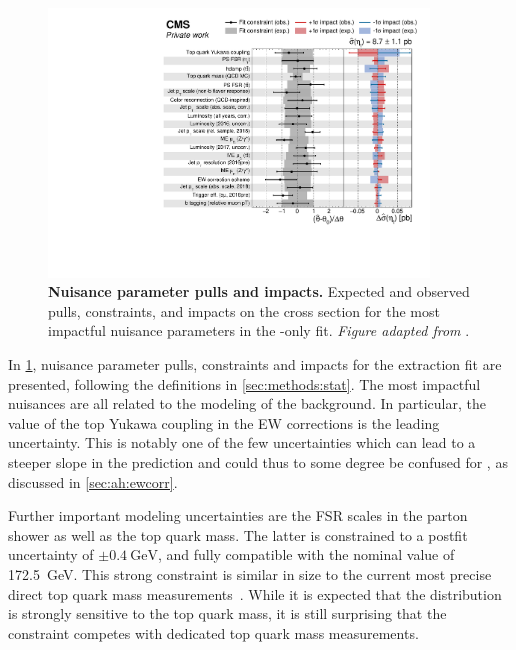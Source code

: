 \begin{figure}[th]
    \centering
    \includegraphics[width=0.9\textwidth]{figures/ah/etatfit/impacts_nonps.pdf}
    \caption{
        \textbf{Nuisance parameter pulls and impacts.} Expected and observed pulls, constraints, and impacts on the \etat cross section for the most impactful nuisance parameters in the \etat-only fit. \textit{Figure adapted from }.
    }
    \label{fig:ah:impacts_etat}
\end{figure}

In \cref{fig:ah:impacts_etat}, nuisance parameter pulls, constraints and impacts for the \etat extraction fit are presented, following the definitions in \cref{sec:methods:stat}. The most impactful nuisances are all related to the modeling of the \ttbar background. In particular, %
the value of the top Yukawa coupling \yt in the EW corrections is the leading uncertainty. This is notably one of the few uncertainties which can lead to a steeper \chel slope in the \ttbar prediction and could thus to some degree be confused for \etat, as discussed in \cref{sec:ah:ewcorr}.

Further important modeling uncertainties are the FSR scales in the \ttbar parton shower as well as the top quark mass. 
The latter is constrained to a postfit uncertainty of $\pm \SI{0.4}{\GeV}$, and fully compatible with the nominal value of \SI{172.5}{\GeV}. This strong constraint is similar in size to the current most precise direct top quark mass measurements~\cite{CMS:TOP-20-008,ATLASCMS:2024dxp}. While it is expected that the \mtt distribution is strongly sensitive to the top quark mass, it is still surprising that the constraint competes with dedicated top quark mass measurements.


